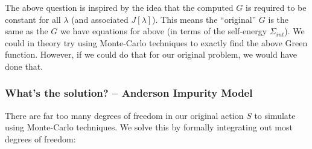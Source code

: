 \documentclass{article}
\begin{document}
The above question is inspired by the idea that the computed $G$ is required to be constant for all $\lambda$ (and associated $J[\lambda]$). This means the ``original'' $G$ is the same as the $G$ we have equations for above (in terms of the self-energy $\Sigma_{int}$). 
We could in theory try using Monte-Carlo techniques to exactly find the above Green function. However, if we could do that for our original problem, we would have done that.

\subsubsection*{What's the solution? -- Anderson Impurity Model}

There are far too many degrees of freedom in our original action $S$ to simulate using Monte-Carlo techniques. We solve this by formally integrating out most degrees of freedom: 
\end{document}
